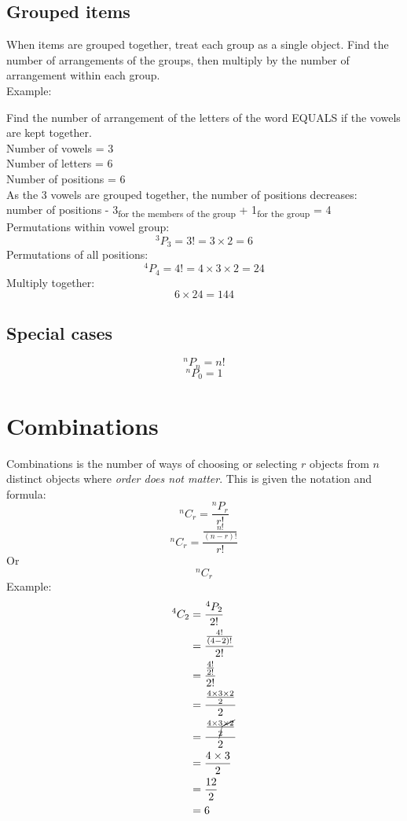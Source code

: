 \documentclass[a4paper,10pt]{report}
\newcommand*{\Comb}[2]{{}^{#1}C_{#2}}%
\begin{document}
\subsection{Grouped items}
When items are grouped together, treat each group as a single object.  Find the number of arrangements of the groups, then multiply by the number of arrangement within each group.\\
Example:\\
\begin{center}
	Find the number of arrangement of the letters of the word EQUALS if the vowels are kept together.\\
	Number of vowels = 3\\
	Number of letters = 6\\
	Number of positions = 6\\
	As the 3 vowels are grouped together, the number of positions decreases:\\ number of positions - 3\textsubscript{for the members of the group} + 1\textsubscript{for the group} = 4\\
	Permutations within vowel group:
	$$^3P_3 = 3! = 3 \times 2 = 6$$
	Permutations of all positions:
	$$^4P_4 = 4! = 4 \times 3 \times 2 = 24$$
	Multiply together:
	$$6 \times 24 = 144$$
\end{center}

\subsection{Special cases}
$$^nP_n = n!$$
$$^nP_0 = 1$$

\section{Combinations}
Combinations is the number of ways of choosing or selecting $r$ objects from $n$ distinct objects where \emph{order does not matter}.  This is given the notation and formula:
$$^nC_r = \frac{^nP_r}{r!}$$
$$^nC_r = \frac{\frac{n!}{(n-r)!}}{r!}$$
Or
$$
	\Comb{n}{r}
$$
Example:\\
\begin{align*}
	^4C_2 & = \frac{^4P_2}{2!}                                          \\
	      & = \frac{\frac{4!}{(4 - 2)!}}{2!}                            \\
	      & = \frac{\frac{4!}{2!}}{2!}                                  \\
	      & = \frac{\frac{4 \times 3 \times 2}{2}}{2}                   \\
	      & = \frac{\frac{4 \times 3 \cancel{\times 2}}{\cancel{2}}}{2} \\
	      & = \frac{4 \times 3}{2}                                      \\
	      & = \frac{12}{2}                                              \\
	      & = 6                                                         \\
\end{align*}
\end{document}
